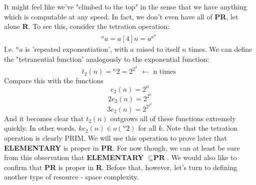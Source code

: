 \documentclass{article}
\theoremstyle{definition}
\theoremstyle{plain}
\theoremstyle{theorem}
\begin{document}
It might feel like we've "climbed to the top" in the sense that we have anything which is computable at any speed. In fact, we don't even have all of \textbf{PR}, let alone \textbf{R}. To see this, consider the tetration operation:
\begin{align}
    ^na = a[4]n = a^{a^{a^{.^{.^{.^{a}}}}}}
\end{align}
I.e. $^na$ is 'repeated exponentiation', with $a$ raised to itself $n$ times. We can define the "tetranential function' analogously to the exponential function:
   \[ t_2(n) = {}^n2 = 2^{2^{2^{.^{.^{.^{2}}}}}} \leftarrow \textrm{ n times }\]
Compare this with the functions
   \[ e_2(n) = 2^n \]
   \[ 2e_2(n) = 2^{2^n} \]
   \[ 3e_2(n) = 2^{2^{2^n}} \]
And it becomes clear that $t_2(n)$ outgrows all of these functions extremely quickly. In other words, $ke_2(n) \in o({}^n2)$ for all $k$. Note that the tetration operation is clearly PRIM. We will use this operation to prove later that \textbf{ELEMENTARY} is proper in \textbf{PR}. For now though, we can at least be sure from this observation that \textbf{ELEMENTARY} $\subseteq \textbf{PR}$. We would also like to confirm that \textbf{PR} is proper in \textbf{R}. Before that, however, let's turn to defining another type of resource - space complexity.
\end{document}
